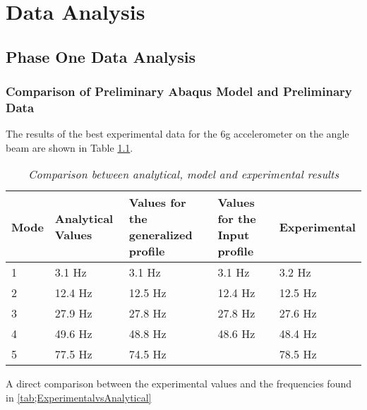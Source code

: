 \chapter{Data Analysis}

\section{Phase One Data Analysis}

\subsection{Comparison of Preliminary Abaqus Model and Preliminary Data }

\indent The results of the best experimental data for the 6g
 accelerometer on the angle beam are shown in Table
  \ref{tab:Results_Comp}.\\
\begin{table}
\begin{center}
    \begin{tabular}{|l| p{3.5cm}| p{3cm}| p{3cm}| p{3cm}|}
    \hline
    \textbf{Mode} & \textbf{Analytical Values} & \textbf{Values for the generalized profile} & \textbf{Values for the Input profile} & \textbf{Experimental} \\\hline
    1    & 3.1 Hz            & 3.1 Hz                             & 3.1 Hz                       & 3.2 Hz       \\\hline
    2    & 12.4 Hz           & 12.5 Hz                            & 12.4 Hz                      & 12.5 Hz      \\\hline
    3    & 27.9 Hz           & 27.8 Hz                            & 27.8 Hz                      & 27.6 Hz      \\\hline
    4    & 49.6 Hz           & 48.8 Hz                            & 48.6 Hz                      & 48.4 Hz      \\\hline
    5    & 77.5 Hz           & 74.5 Hz                            &                             & 78.5 Hz      \\\hline
    \end{tabular}
    \caption{\textit{Comparison between analytical, model and experimental results}}
    \label{tab:Results_Comp}
\end{center}
\end{table}

A direct comparison between the experimental values and the frequencies found in \ref{tab;ExperimentalvsAnalytical}\\


